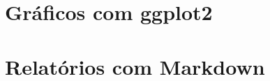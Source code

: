 \documentclass[]{book}
\theoremstyle{definition}
\theoremstyle{definition}
\theoremstyle{definition}
\theoremstyle{remark}
\begin{document}
\hypertarget{ggplot}{%
\chapter{Gráficos com ggplot2}\label{ggplot}}

\hypertarget{mark}{%
\chapter{Relatórios com Markdown}\label{mark}}


\end{document}
